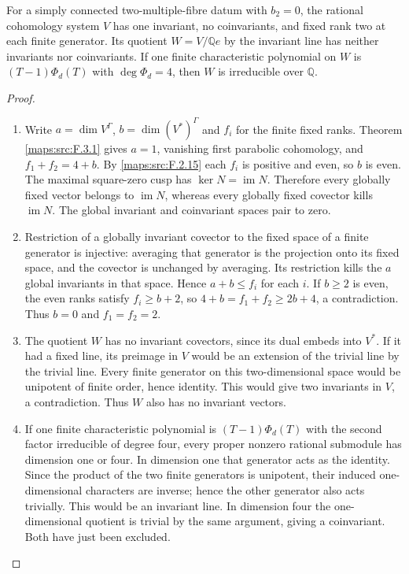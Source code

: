 \begin{proposition}\hypertarget{tag-02O0}{}\label{maps:src:F.2.9}


For a simply connected two-multiple-fibre datum with $b_2=0$,
the rational
cohomology system $V$ has one invariant, no coinvariants,
and fixed rank two at each finite generator.  Its quotient
$W=V/\mathbb Qe$ by the invariant line has neither invariants
nor coinvariants.  If one finite characteristic polynomial
on $W$ is $(T-1)\Phi_d(T)$ with $\deg\Phi_d=4$, then $W$
is irreducible over $\mathbb Q$.

\end{proposition}


\begin{proof}
\begin{enumerate}[label={$\langle1\rangle$\arabic*.}]
\item Write $a=\dim V^\Gamma$, $b=\dim(V^*)^\Gamma$ and $f_i$
for the finite fixed ranks.  Theorem \ref{maps:src:F.3.1} gives $a=1$,
vanishing first parabolic cohomology, and
$f_1+f_2=4+b$.  By \ref{maps:src:F.2.15} each $f_i$ is positive and even, so $b$ is
even.  The maximal square-zero cusp has
$\ker N=\operatorname{im}N$.  Therefore every globally
fixed vector belongs to $\operatorname{im}N$, whereas every
globally fixed covector kills $\operatorname{im}N$.
The global invariant and coinvariant spaces pair to zero.

\item Restriction of a globally invariant covector to the fixed
space of a finite generator is injective: averaging that
generator is the projection onto its fixed space, and the
covector is unchanged by averaging.  Its restriction kills
the $a$ global invariants in that space.  Hence
$a+b\leq f_i$ for each $i$.
If $b\geq2$ is even, the even ranks satisfy
$f_i\geq b+2$, so $4+b=f_1+f_2\geq2b+4$, a contradiction.
Thus $b=0$ and $f_1=f_2=2$.

\item The quotient $W$ has no invariant covectors, since its dual
embeds into $V^*$.  If it had a fixed line, its preimage in
$V$ would be an extension of the trivial line by the trivial
line.  Every finite generator on this two-dimensional
space would be unipotent of finite order, hence identity.
This would give two invariants in $V$, a contradiction.
Thus $W$ also has no invariant vectors.

\item If one finite characteristic polynomial is
$(T-1)\Phi_d(T)$ with the second factor irreducible of degree
four, every proper nonzero rational submodule has dimension
one or four.  In dimension one that generator acts as the
identity.  Since the product of the two finite generators
is unipotent, their induced one-dimensional characters are
inverse; hence the other generator also acts trivially.
This would be an invariant line.  In dimension four the
one-dimensional quotient is trivial by the same argument,
giving a coinvariant.  Both have just been excluded.

\end{enumerate}
\end{proof}


